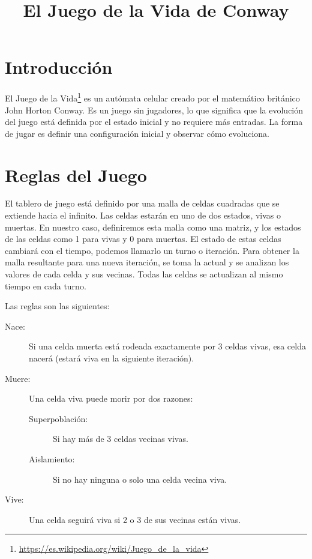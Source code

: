 \documentclass[10pt,a4paper]{article}
\title{{\huge El Juego de la Vida de Conway}}
\date{}
\begin{document}
\maketitle

\section{Introducción}

El Juego de la Vida\footnote{\href{https://es.wikipedia.org/wiki/Juego\_de\_la\_vida}{https://es.wikipedia.org/wiki/Juego\_de\_la\_vida}} es un autómata celular creado por el matemático británico John Horton Conway. Es un juego sin jugadores, lo que significa que la evolución del juego está definida por el estado inicial y no requiere más entradas. La forma de jugar es definir una configuración inicial y observar cómo evoluciona.

\section{Reglas del Juego}
El tablero de juego está definido por una malla de celdas cuadradas que se extiende hacia el infinito. Las celdas estarán en uno de dos estados, vivas o muertas. En nuestro caso, definiremos esta malla como una matriz, y los estados de las celdas como 1 para vivas y 0 para muertas. El estado de estas celdas cambiará con el tiempo, podemos llamarlo un turno o iteración. Para obtener la malla resultante para una nueva iteración, se toma la actual y se analizan los valores de cada celda y sus vecinas. Todas las celdas se actualizan al mismo tiempo en cada turno.

Las reglas son las siguientes:

\begin{description}
\item[Nace:] Si una celda muerta está rodeada exactamente por 3 celdas vivas, esa celda nacerá (estará viva en la siguiente iteración).
\item[Muere:] Una celda viva puede morir por dos razones:
    \begin{description}
    \item[Superpoblación:] Si hay más de 3 celdas vecinas vivas.
    \item[Aislamiento:] Si no hay ninguna o solo una celda vecina viva.
    \end{description} 
\item[Vive:] Una celda seguirá viva si 2 o 3 de sus vecinas están vivas.
\end{description}
\end{document}

